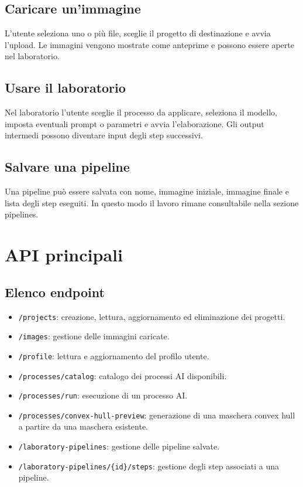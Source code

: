 \documentclass[oneside]{supsistudent}
\begin{document}
\section{Caricare un'immagine}
L'utente seleziona uno o più file, sceglie il progetto di destinazione e avvia l'upload. Le immagini vengono mostrate come
anteprime e possono essere aperte nel laboratorio.

\section{Usare il laboratorio}
Nel laboratorio l'utente sceglie il processo da applicare, seleziona il modello, imposta eventuali prompt o parametri e avvia
l'elaborazione. Gli output intermedi possono diventare input degli step successivi.

\section{Salvare una pipeline}
Una pipeline può essere salvata con nome, immagine iniziale, immagine finale e lista degli step eseguiti. In questo modo il lavoro
rimane consultabile nella sezione pipelines.

\chapter{API principali}

\section{Elenco endpoint}
\begin{itemize}
    \item \texttt{/projects}: creazione, lettura, aggiornamento ed eliminazione dei progetti.
    \item \texttt{/images}: gestione delle immagini caricate.
    \item \texttt{/profile}: lettura e aggiornamento del profilo utente.
    \item \texttt{/processes/catalog}: catalogo dei processi AI disponibili.
    \item \texttt{/processes/run}: esecuzione di un processo AI.
    \item \texttt{/processes/convex-hull-preview}: generazione di una maschera convex hull a partire da una maschera esistente.
    \item \texttt{/laboratory-pipelines}: gestione delle pipeline salvate.
    \item \texttt{/laboratory-pipelines/\{id\}/steps}: gestione degli step associati a una pipeline.
\end{itemize}
\end{document}
